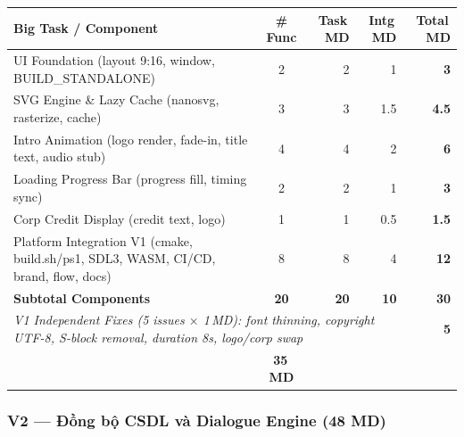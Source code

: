 \documentclass[12pt,a4paper]{article}
\begin{document}
\begin{tabularx}{\linewidth}{|X|c|r|r|r|}
\hline
\rowcolor{storyBlue!18}
\textbf{Big Task / Component} & \textbf{\# Func} & \textbf{Task\,MD} & \textbf{Intg\,MD} & \textbf{Total\,MD} \\
\hline
\rowcolor{rowLight}
UI Foundation (layout 9:16, window, BUILD\_STANDALONE) & 2 & 2 & 1 & \textbf{3} \\
SVG Engine \& Lazy Cache (nanosvg, rasterize, cache) & 3 & 3 & 1.5 & \textbf{4.5} \\
\rowcolor{rowLight}
Intro Animation (logo render, fade-in, title text, audio stub) & 4 & 4 & 2 & \textbf{6} \\
Loading Progress Bar (progress fill, timing sync) & 2 & 2 & 1 & \textbf{3} \\
\rowcolor{rowLight}
Corp Credit Display (credit text, logo) & 1 &
1 & 0.5 & \textbf{1.5} \\
Platform Integration V1 (cmake, build.sh/ps1, SDL3, WASM, CI/CD, brand, flow, docs) & 8 & 8 & 4 & \textbf{12} \\
\hline
\rowcolor{storyBlue!12}
\textbf{Subtotal Components} & \textbf{20} & \textbf{20} & \textbf{10} & \textbf{30} \\
\hline
\multicolumn{4}{|p{0.82\linewidth}|}{\raggedright \textit{V1 Independent Fixes (5 issues $\times$ 1\,MD): font thinning, copyright UTF-8, S-block removal, duration 8s, logo/corp swap}} & \textbf{5} \\
\hline
\rowcolor{v1green!15}
\multicolumn{4}{|l|}{\textbf{V1 Grand Total}} & \textbf{35\,MD} \\
\hline
\end{tabularx}

\subsubsection{V2 — Đồng bộ CSDL và Dialogue Engine (48 MD)}
\end{document}
